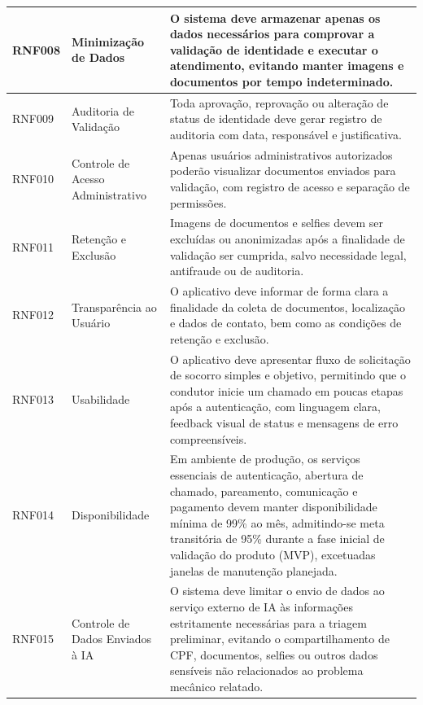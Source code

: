 \documentclass[12pt, a4paper]{article}
\begin{document}
{\begin{longtable}{|>{\raggedright\arraybackslash}p{}|>{\raggedright\arraybackslash}p{}|>{\raggedright\arraybackslash}p{}|}
RNF008 & Minimização de Dados & O sistema deve armazenar apenas os dados necessários para comprovar a validação de identidade e executar o atendimento, evitando manter imagens e documentos por tempo indeterminado. \\ \hline
RNF009 & Auditoria de Validação & Toda aprovação, reprovação ou alteração de status de identidade deve gerar registro de auditoria com data, responsável e justificativa. \\ \hline
RNF010 & Controle de Acesso Administrativo & Apenas usuários administrativos autorizados poderão visualizar documentos enviados para validação, com registro de acesso e separação de permissões. \\ \hline
RNF011 & Retenção e Exclusão & Imagens de documentos e selfies devem ser excluídas ou anonimizadas após a finalidade de validação ser cumprida, salvo necessidade legal, antifraude ou de auditoria. \\ \hline
RNF012 & Transparência ao Usuário & O aplicativo deve informar de forma clara a finalidade da coleta de documentos, localização e dados de contato, bem como as condições de retenção e exclusão. \\ \hline
RNF013 & Usabilidade & O aplicativo deve apresentar fluxo de solicitação de socorro simples e objetivo, permitindo que o condutor inicie um chamado em poucas etapas após a autenticação, com linguagem clara, feedback visual de status e mensagens de erro compreensíveis. \\ \hline
RNF014 & Disponibilidade & Em ambiente de produção, os serviços essenciais de autenticação, abertura de chamado, pareamento, comunicação e pagamento devem manter disponibilidade mínima de 99\% ao mês, admitindo-se meta transitória de 95\% durante a fase inicial de validação do produto (MVP), excetuadas janelas de manutenção planejada. \\ \hline
RNF015 & Controle de Dados Enviados à IA & O sistema deve limitar o envio de dados ao serviço externo de IA às informações estritamente necessárias para a triagem preliminar, evitando o compartilhamento de CPF, documentos, selfies ou outros dados sensíveis não relacionados ao problema mecânico relatado. \\ \hline
\end{longtable}
}
\end{document}
